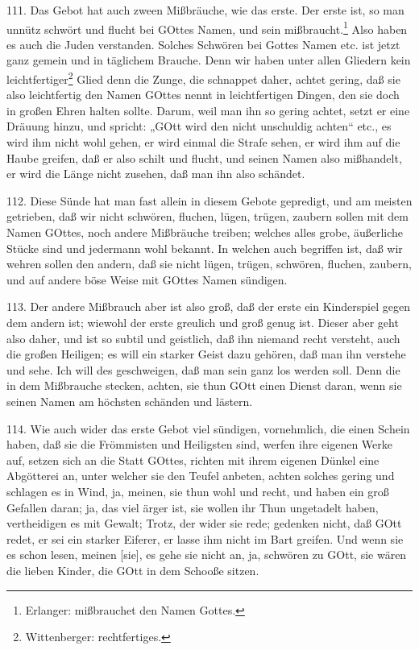 111. Das Gebot hat auch zween Mißbräuche, wie das erste. Der erste ist, so man unnütz schwört und flucht bei GOttes Namen, und sein mißbraucht.\footnote{Erlanger: mißbrauchet den Namen Gottes.} Also haben es auch die Juden verstanden. Solches Schwören bei Gottes Namen etc. ist jetzt ganz gemein und in täglichem Brauche. Denn wir haben unter allen Gliedern kein leichtfertiger\footnote{Wittenberger: rechtfertiges.} Glied denn die Zunge, die schnappet daher, achtet gering, daß sie also leichtfertig den Namen GOttes nennt in leichtfertigen Dingen, den sie doch in großen Ehren halten sollte. Darum, weil man ihn so gering achtet, setzt er eine Dräuung hinzu, und spricht: „GOtt wird den nicht unschuldig achten“ etc., es wird ihm nicht wohl gehen, er wird einmal die Strafe sehen, er wird ihm auf die Haube greifen, daß er also schilt und flucht, und seinen
Namen also mißhandelt, er wird die Länge nicht zusehen, daß man ihn also schändet.

112. Diese Sünde hat man fast allein in diesem Gebote gepredigt, und am meisten getrieben, daß wir nicht schwören, fluchen, lügen, trügen, zaubern sollen mit dem Namen GOttes, noch andere Mißbräuche treiben; welches alles grobe, äußerliche Stücke sind und jedermann wohl bekannt. In welchen auch begriffen ist, daß wir wehren sollen den andern, daß sie nicht lügen, trügen, schwören, fluchen, zaubern, und auf andere böse Weise mit GOttes Namen sündigen.

113. Der andere Mißbrauch aber ist also groß, daß der erste ein Kinderspiel gegen dem andern ist; wiewohl der erste greulich und groß genug ist. Dieser aber geht also daher, und ist so subtil und geistlich, daß ihn niemand recht versteht, auch die großen Heiligen; es will ein starker Geist dazu gehören, daß man ihn verstehe und sehe. Ich will des geschweigen, daß man sein ganz los werden soll. Denn die in dem Mißbrauche stecken, achten, sie thun GOtt einen Dienst daran, wenn sie seinen Namen am höchsten schänden und lästern.

114. Wie auch wider das erste Gebot viel sündigen, vornehmlich, die einen Schein haben, daß sie die Frömmisten und Heiligsten sind, werfen ihre eigenen Werke auf, setzen sich an die Statt GOttes, richten mit ihrem eigenen Dünkel eine Abgötterei an, unter welcher sie den Teufel anbeten, achten solches gering und schlagen es in Wind, ja, meinen, sie thun wohl und recht, und haben ein groß Gefallen daran; ja, das viel ärger ist, sie wollen ihr Thun ungetadelt haben, vertheidigen es mit Gewalt; Trotz, der wider sie rede; gedenken nicht, daß GOtt redet, er sei ein starker Eiferer, er lasse ihm nicht im Bart greifen. Und wenn sie es schon lesen, meinen [sie], es gehe sie nicht an, ja, schwören zu GOtt, sie wären die lieben Kinder, die GOtt in dem Schooße sitzen.

